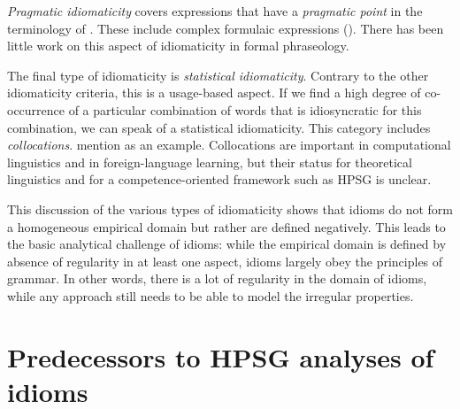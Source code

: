 \documentclass[output=paper
                ,modfonts
                ,nonflat
	        ,collection
	        ,collectionchapter
	        ,collectiontoclongg
 	        ,biblatex
                ,babelshorthands
                ,newtxmath
                ,draftmode
                ,colorlinks, citecolor=brown
]{./langsci/langscibook}
\begin{document}
\emph{Pragmatic idiomaticity} covers expressions that have a \emph{pragmatic point} in the terminology of \citet{FKoC88a}. These include complex formulaic expressions (). There has been little work on this aspect of idiomaticity in formal phraseology.

The final type of idiomaticity is \emph{statistical idiomaticity}. 
Contrary to the other idiomaticity criteria, this is a usage-based aspect. If we find a high degree of co-occurrence of a particular combination of words that is idiosyncratic for this combination, we can speak of a statistical idiomaticity. This category includes \emph{collocations}. \citet{Baldwin:Kim:10} mention  as an example. Collocations are important in computational linguistics and in foreign-language learning, but their status for theoretical linguistics and for a competence-oriented framework such as HPSG is unclear. 

This discussion of the various types of idiomaticity shows that idioms do not form a homogeneous empirical domain but rather are defined negatively. 
This leads to the basic analytical challenge of idioms: while the empirical domain is defined by  absence of regularity in at least one aspect, idioms largely obey the principles of grammar. 
In other words, there is a lot of regularity in the domain of idioms, while any approach still needs to be able to model the irregular properties. 






\section{Predecessors to HPSG analyses of idioms}
\label{Sec-Predecessors}
\end{document}
